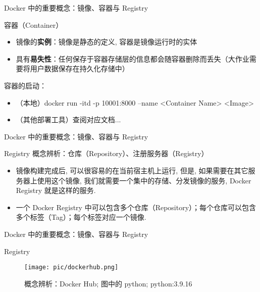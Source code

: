 \documentclass{beamer}
\begin{document}
\begin{frame}{Docker 中的重要概念：镜像、容器与 Registry}
    \begin{block}{容器（Container）}
        \begin{itemize}
            \item 镜像的\textbf{实例}：镜像是静态的定义, 容器是镜像运行时的实体
            \item 具有\textbf{易失性}：任何保存于容器存储层的信息都会随容器删除而丢失（大作业需要将用户数据保存在持久化存储中）
        \end{itemize}
        容器的启动：
        \begin{itemize}
            \item （本地）docker run -itd -p 10001:8000 --name <Container Name> <Image>
            \item （其他部署工具）查阅对应文档...
        \end{itemize}
    \end{block}
\end{frame}


\begin{frame}{Docker 中的重要概念：镜像、容器与 Registry}
    \begin{block}{Registry}
        概念辨析：仓库（Repository）、注册服务器（Registry）
        \begin{itemize}
            \item 镜像构建完成后, 可以很容易的在当前宿主机上运行, 但是, 如果需要在其它服务器上使用这个镜像, 我们就需要一个集中的存储、分发镜像的服务, Docker Registry 就是这样的服务. 
            \item 一个 Docker Registry 中可以包含多个仓库（Repository）；每个仓库可以包含多个标签（Tag）；每个标签对应一个镜像. 
        \end{itemize}
    \end{block}
\end{frame}


\begin{frame}{Docker 中的重要概念：镜像、容器与 Registry}
    \begin{block}{Registry}
        \begin{figure}
            \centering
            \texttt{[image: pic/dockerhub.png]}
            \caption{概念辨析：Docker Hub; 图中的 python;  python:3.9.16}
            \label{fig:my_label}
        \end{figure}

    \end{block}
\end{frame}
\end{document}
